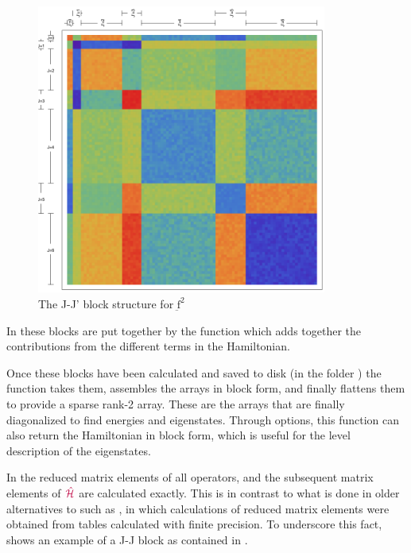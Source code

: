 \documentclass[11pt, twoside,openright]{article}
\begin{document}
\begin{figure}[h!]
	\centering
	\includegraphics[width=0.85\textwidth]{./figures/blockStruct.pdf}
	\caption{The J-J' block structure for $\underbar{\text{f}}^2$}
	\label{JJ blocks} 
\end{figure}

In \qlanth these blocks are put together by the function  which adds together the contributions from the different terms in the Hamiltonian.



Once these blocks have been calculated and saved to disk (in the folder ) the function  takes them, assembles the arrays in block form, and finally flattens them to provide a sparse rank-2 array. These are the arrays that are finally diagonalized to find energies and eigenstates. Through options, this function can also return the Hamiltonian in block form, which is useful for the level description of the eigenstates.



In \qlanth the reduced matrix elements of all operators, and the subsequent matrix elements of $\textcolor{purple}{\hat{\mathcal{H}}}$ are calculated exactly. This is in contrast to what is done in older alternatives to \qlanth such as , in which calculations of reduced matrix elements were obtained from tables calculated with finite precision. To underscore this fact,  shows an example of a J-J block as contained in \qlanth.
\end{document}
